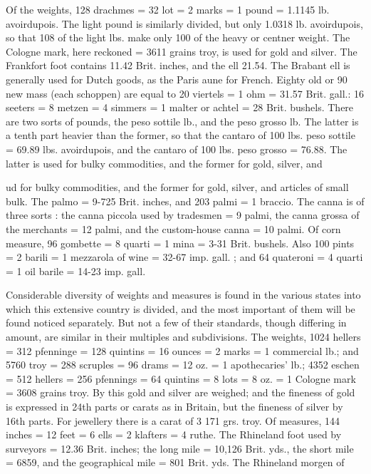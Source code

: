 \documentclass{article}
\begin{document}
Of the weights, 128 drachmes = 32 lot = 2 marks = 1 pound = 1.1145 lb. avoirdupois. The light pound is similarly divided, but only 1.0318 lb. avoirdupois, so that 108 of the light lbs. make only 100 of the heavy or centner weight. The Cologne mark, here reckoned = 3611 grains troy, is used for gold and silver. The Frankfort foot contains 11.42 Brit. inches, and the ell 21.54. The Brabant ell is generally used for Dutch goods, as the Paris aune for French. Eighty old or 90 new mass (each schoppen) are equal to 20 viertels = 1 ohm = 31.57 Brit. gall.: 16 seeters = 8 metzen = 4 simmers = 1 malter or achtel = 28 Brit. bushels. There are two sorts of pounds, the peso sottile lb., and the peso grosso lb. The latter is a tenth part heavier than the former, so that the cantaro of 100 lbs. peso sottile = 69.89 lbs. avoirdupois, and the cantaro of 100 lbs. peso grosso = 76.88. The latter is used for bulky commodities, and the former for gold, silver, and

ud for bulky commodities, and the former for gold, silver, and articles of small bulk. The palmo = 9-725 Brit. inches, and 203 palmi = 1 braccio. The canna is of three sorts : the canna piccola used by tradesmen = 9 palmi, the canna grossa of the merchants = 12 palmi, and the custom-house canna = 10 palmi. Of corn measure, 96 gombette = 8 quarti = 1 mina = 3-31 Brit. bushels. Also 100 pints = 2 barili = 1 mezzarola of wine = 32-67 imp. gall. ; and 64 quateroni = 4 quarti = 1 oil barile = 14-23 imp. gall.

Considerable diversity of weights and measures is found in the various states into which this extensive country is divided, and the most important of them will be found noticed separately. But not a few of their standards, though differing in amount, are similar in their multiples and subdivisions. The weights, 1024 hellers = 312 pfenninge = 128 quintins = 16 ounces = 2 marks = 1 commercial lb.; and 5760 troy = 288 scruples = 96 drams = 12 oz. = 1 apothecaries' lb.; 4352 eschen = 512 hellers = 256 pfennings = 64 quintins = 8 lots = 8 oz. = 1 Cologne mark = 3608 grains troy. By this gold and silver are weighed; and the fineness of gold is expressed in 24th parts or carats as in Britain, but the fineness of silver by 16th parts. For jewellery there is a carat of 3 171 grs. troy. Of measures, 144 inches = 12 feet = 6 ells = 2 klafters = 4 ruthe. The Rhineland foot used by surveyors = 12.36 Brit. inches; the long mile = 10,126 Brit. yds., the short mile = 6859, and the geographical mile = 801 Brit. yds. The Rhineland morgen of
\end{document}
